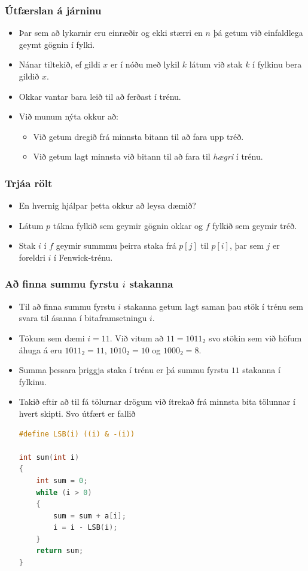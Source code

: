\documentclass{beamer}
\begin{document}
\begin{frame}
	\frametitle{Útfærslan á járninu}
	\begin{itemize}
		\item<1-> Þar sem að lykarnir eru einræðir og ekki stærri en $n$ þá getum við einfaldlega geymt gögnin í fylki.
		\item<2-> Nánar tiltekið, ef gildi $x$ er í nóðu með lykil $k$ látum við stak $k$ í fylkinu bera gildið $x$.
		\item<3-> Okkar vantar bara leið til að ferðast í trénu.
		\item<4-> Við munum nýta okkur að:
			\begin{itemize}
				\item<5-> Við getum dregið frá minnsta bitann til að fara upp tréð.
				\item<6-> Við getum lagt minnsta við bitann til að fara til \emph{hægri} í trénu.
			\end{itemize}
	\end{itemize}
\end{frame}

\begin{frame}
	\frametitle{Trjáa rölt}
	\begin{itemize}
		\item<1-> En hvernig hjálpar þetta okkur að leysa dæmið?
		\item<2-> Látum $p$ tákna fylkið sem geymir gögnin okkar og $f$ fylkið sem geymir tréð.
		\item<3-> Stak $i$ í $f$ geymir summmu þeirra staka frá $p[j]$ til $p[i]$, þar sem $j$ er foreldri 
			$i$ í Fenwick-trénu.
	\end{itemize}
\end{frame}

\begin{frame}[fragile]
	\frametitle{Að finna summu fyrstu $i$ stakanna}
	\begin{itemize}
		\item<1-> Til að finna summu fyrstu $i$ stakanna getum lagt saman þau stök í trénu sem svara til ásanna í bitaframsetningu $i$.
		\item<2-> Tökum sem dæmi $i = 11$. Við vitum að $11 = 1011_2$ svo stökin sem við höfum áhuga á eru $1011_2 = 11$, $1010_2 = 10$
			og $1000_2 = 8$.
		\item<3-> Summa þessara þriggja staka í trénu er þá summu fyrstu $11$ stakanna í fylkinu.
		\item<4-> Takið eftir að til fá tölurnar drögum við ítrekað frá minnsta bita tölunnar í hvert skipti. Svo útfært er fallið
		\tiny
		\begin{lstlisting}[language=C]
#define LSB(i) ((i) & -(i))

int sum(int i)
{
	int sum = 0;
	while (i > 0) 
	{
		sum = sum + a[i];
		i = i - LSB(i);
	}
	return sum;
}
\end{lstlisting}
	\end{itemize}
\end{frame}
\end{document}
